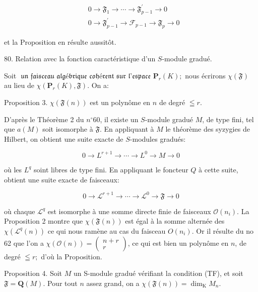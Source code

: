 $$
\begin{aligned}
    &0 \rightarrow \mathfrak{F}_{1} \rightarrow \cdots \rightarrow \mathfrak{F}_{p-1}^{\prime} \rightarrow 0 \\
    &0 \rightarrow \mathfrak{F}_{p-1}^{\prime} \rightarrow \mathcal{F}_{p-1} \rightarrow \mathfrak{F}_{p} \rightarrow 0
\end{aligned}
$$

et la Proposition en résulte aussitôt.

80. Relation avec la fonction caractéristique d'un $S$-module gradué.

Soit $\mathfrak{\text { un faisceau algébrique cohérent sur l'espace }} \mathbf{P}_{r}(K) ;$ nous écrirons $\chi(\mathfrak{F})$ au lieu de $\chi\left(\mathbf{P}_{r}(K), \mathfrak{F}\right)$. On a:

Proposition 3. $\chi(\mathfrak{F}(n))$ est un polynôme en $n$ de degré $\leqq r$.

D'après le Théorème 2 du $n^{\circ} 60$, il existe un $S$-module gradué $M$, de type fini, tel que $a(M)$ soit isomorphe à $\mathfrak{F} .$ En appliquant à $M$ le théorème des syzygies de Hilbert, on obtient une suite exacte de $S$-modules gradués:

$$
0 \rightarrow L^{r+1} \rightarrow \cdots \rightarrow L^{0} \rightarrow M \rightarrow 0
$$

où les $L^{q}$ soint libres de type fini. En appliquant le foncteur $Q$ à cette suite, obtient une suite exacte de faisceaux:

$$
0 \rightarrow \mathcal{L}^{r+1} \rightarrow \cdots \rightarrow \mathcal{L}^{0} \rightarrow \mathfrak{F} \rightarrow 0
$$

où chaque $\mathcal{L}^{q}$ est isomorphe à une somme directe finie de faisceaux $\mathcal{O}\left(n_{i}\right) .$ La Proposition 2 montre que $\chi(\mathfrak{F}(n))$ est égal à la somme alternée des $\chi\left(\mathscr{L}^{q}(n)\right)$ ce qui nous ramène au cas du faisceau $O\left(n_{i}\right) .$ Or il résulte du no 62 que l'on a $\chi(\mathcal{O}(n))=\left(\begin{array}{c}n+r \\ r\end{array}\right)$, ce qui est bien un polynôme en $n$, de degré $\leqq r ;$ d'où la Proposition.

Proposition 4. Soit $M$ un S-module gradué vérifiant la condition (TF), et soit $\mathfrak{F}=\boldsymbol{Q}(M) .$ Pour tout $n$ assez grand, on a $\chi(\mathfrak{F}(n))=\operatorname{dim}_{\mathrm{K}} M_{n}$.

